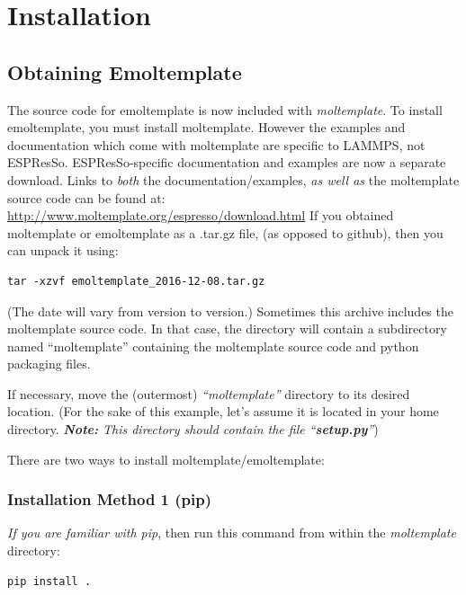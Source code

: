 \documentclass[11pt]{article}
\begin{document}
\section{Installation}

\subsection*{Obtaining Emoltemplate}

The source code for emoltemplate is now included with \textit{moltemplate}.
To install emoltemplate, you must install moltemplate.
However the examples and documentation
which come with moltemplate are specific to LAMMPS, not ESPResSo.
ESPResSo-specific documentation and examples are now a separate download.
Links to \textit{both} the documentation/examples, \textit{as well as} the
moltemplate source code can be found at:
\url{http://www.moltemplate.org/espresso/download.html}
If you obtained moltemplate or emoltemplate as a .tar.gz file,
(as opposed to github), then you can unpack it using:
\begin{verbatim}
tar -xzvf emoltemplate_2016-12-08.tar.gz
\end{verbatim}
(The date will vary from version to version.)
Sometimes this archive includes the moltemplate source code.
In that case, the directory will contain a subdirectory named ``moltemplate''
containing the moltemplate source code and python packaging files.

If necessary, move the (outermost) \textit{``moltemplate''} directory to its 
desired location. (For the sake of this example, let's assume it is located
in your home directory.
\textit{\textbf{Note:} This directory should contain the file
        ``\textbf{setup.py}''})

There are two ways to install moltemplate/emoltemplate:

\subsubsection*{Installation Method 1 (pip)}

\textit{If you are familiar with pip}, then run this command from within
the \textit{moltemplate} directory:
\begin{verbatim}
pip install .
\end{verbatim}
\end{document}
